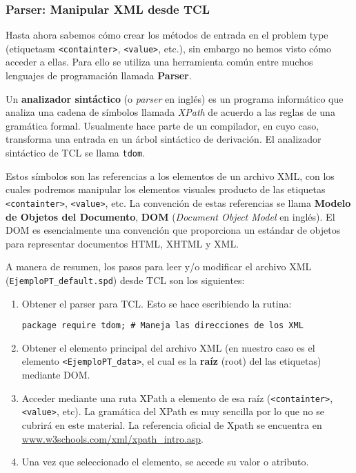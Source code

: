 \documentclass[10pt, a4paper, twocolumn]{article} %
\begin{document}
\subsubsection{Parser: Manipular XML desde TCL}

Hasta ahora sabemos cómo crear los métodos de entrada en el problem type (etiquetasm \texttt{<containter>}, \texttt{<value>}, etc.), sin embargo no hemos visto cómo acceder a ellas. Para ello se utiliza una herramienta común entre muchos lenguajes de programación llamada \textbf{Parser}.

Un \textbf{analizador sintáctico} (o \textit{parser} en inglés) es un programa informático que analiza una cadena de símbolos llamada \textit{XPath} de acuerdo a las reglas de una gramática formal. Usualmente hace parte de un compilador, en cuyo caso, transforma una entrada en un árbol sintáctico de derivación. El analizador sintáctico de TCL se llama \texttt{tdom}.

Estos símbolos son las referencias a los elementos de un archivo XML, con los cuales podremos manipular los elementos visuales producto de las etiquetas \texttt{<containter>}, \texttt{<value>}, etc. La convención de estas referencias se llama \textbf{Modelo de Objetos del Documento}, \textbf{DOM} (\textit{Document Object Model} en inglés). El DOM es esencialmente una convención que proporciona un estándar de objetos para representar documentos HTML, XHTML y XML.

A manera de resumen, los pasos para leer y/o modificar el archivo XML (\texttt{EjemploPT\_default.spd}) desde TCL son los siguientes:

\begin{enumerate}
	\item Obtener el parser para TCL. Esto se hace escribiendo la rutina:
	\begin{lstlisting}[caption={Instrucción para obtener el parser para TCL.}]
	package require tdom; # Maneja las direcciones de los XML
	\end{lstlisting}
	\item Obtener el elemento principal del archivo XML (en nuestro caso es el elemento \texttt{<EjemploPT\_data>}, el cual es la \textbf{raíz} (root) del las etiquetas) mediante DOM.
	\item Acceder mediante una ruta XPath a elemento de esa raíz (\texttt{<containter>}, \texttt{<value>}, etc). La gramática del XPath es muy sencilla por lo que no se cubrirá en este material. La referencia oficial de Xpath se encuentra en \textcolor{BlueGiD}{\underline{\url{www.w3schools.com/xml/xpath_intro.asp}}}.
	\item Una vez que seleccionado el elemento, se accede su valor o atributo.
\end{enumerate}
\end{document}
